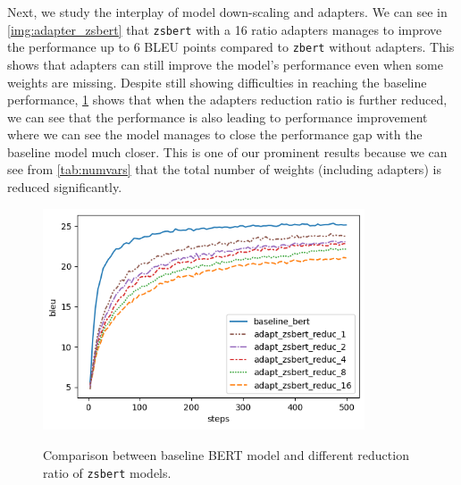 Next, we study the interplay of model down-scaling and adapters. We can see in \cref{img:adapter_zsbert} that \texttt{zsbert} with a 16 ratio adapters manages to improve the performance up to 6 BLEU points compared to \texttt{zbert} without adapters. This shows that adapters can still improve the model's performance even when some weights are missing.
Despite still showing difficulties in reaching the baseline performance, \cref{img:adapter_zsbert_ratio} shows that when the adapters reduction ratio is further reduced, we can see that the performance is also leading to performance improvement where we can see the model manages to close the performance gap with the baseline model much closer. This is one of our prominent results because we can see from \cref{tab:numvars} that the total number of weights (including adapters) is reduced significantly.

\begin{figure}[]
    {\includegraphics[width=0.85\textwidth]{img/adapter_zsbert_ratio.png}}
    \centering
    \caption{Comparison between baseline BERT model and different reduction ratio of \texttt{zsbert} models.}
    \label{img:adapter_zsbert_ratio}
\end{figure}


